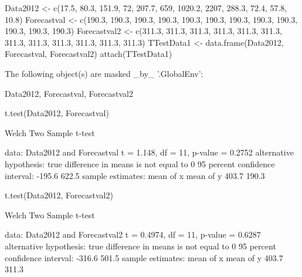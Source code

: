 \documentclass{article}\usepackage{graphicx, color}
\begin{document}
\begin{Schunk}
\begin{Sinput}
Data2012 <- c(17.5, 80.3, 151.9, 72, 207.7, 659, 1020.2, 2207, 288.3, 72.4, 
    57.8, 10.8)
Forecastval <- c(190.3, 190.3, 190.3, 190.3, 190.3, 190.3, 190.3, 190.3, 190.3, 
    190.3, 190.3, 190.3)
Forecastval2 <- c(311.3, 311.3, 311.3, 311.3, 311.3, 311.3, 311.3, 311.3, 311.3, 
    311.3, 311.3, 311.3)
TTestData1 <- data.frame(Data2012, Forecastval, Forecastval2)
attach(TTestData1)
\end{Sinput}
\begin{Soutput}
The following object(s) are masked _by_ '.GlobalEnv':

    Data2012, Forecastval, Forecastval2
\end{Soutput}
\begin{Sinput}
t.test(Data2012, Forecastval)
\end{Sinput}
\begin{Soutput}

	Welch Two Sample t-test

data:  Data2012 and Forecastval 
t = 1.148, df = 11, p-value = 0.2752
alternative hypothesis: true difference in means is not equal to 0 
95 percent confidence interval:
 -195.6  622.5 
sample estimates:
mean of x mean of y 
    403.7     190.3 
\end{Soutput}
\begin{Sinput}
t.test(Data2012, Forecastval2)
\end{Sinput}
\begin{Soutput}

	Welch Two Sample t-test

data:  Data2012 and Forecastval2 
t = 0.4974, df = 11, p-value = 0.6287
alternative hypothesis: true difference in means is not equal to 0 
95 percent confidence interval:
 -316.6  501.5 
sample estimates:
mean of x mean of y 
    403.7     311.3 
\end{Soutput}
\end{Schunk}
\end{document}
